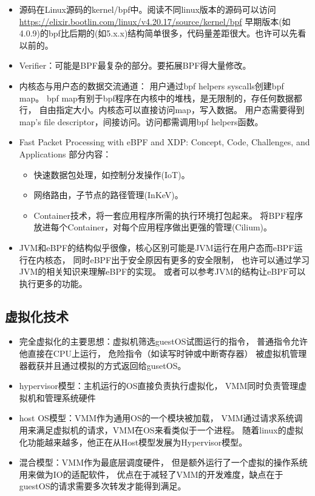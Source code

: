 \documentclass[AutoFakeBold,a4paper]{ctexart}
\begin{document}
\begin{itemize}
    \item 源码在Linux源码的kernel/bpf中。阅读不同linux版本的源码可以访问
    \url{https://elixir.bootlin.com/linux/v4.20.17/source/kernel/bpf}
    早期版本(如4.0.9)的bpf比后期的(如5.x.x)结构简单很多，代码量差距很大。也许可以先看以前的。
    \item Verifier：可能是BPF最复杂的部分。要拓展BPF得大量修改。
    \item 内核态与用户态的数据交流通道：
    用户通过bpf helpers syscalls创建bpf map。
    bpf map有别于bpf程序在内核中的堆栈，是无限制的，存任何数据都行，
    自由指定大小。内核态可以直接访问map，写入数据。
    用户态需要得到map's file descriptor，间接访问。访问都需调用bpf helpers函数。
    \item Fast Packet Processing with eBPF and XDP: 
    Concept, Code, Challenges, and Applications 部分内容：
    \begin{itemize}
        \item 快速数据包处理，如控制分发操作(IoT)。
        \item 网络路由，子节点的路径管理(InKeV)。
        \item Container技术，将一套应用程序所需的执行环境打包起来。
        将BPF程序放进每个Container，对每个应用程序做出更强的管理(Cilium)。
    \end{itemize}
    \item JVM和eBPF的结构似乎很像，核心区别可能是JVM运行在用户态而eBPF运行在内核态，
    同时eBPF出于安全原因有更多的安全限制，
    也许可以通过学习JVM的相关知识来理解eBPF的实现。
    或者可以参考JVM的结构让eBPF可以执行更多的功能。
\end{itemize}

\subsection{虚拟化技术}

\begin{itemize}
    \item 完全虚拟化的主要思想：虚拟机筛选guestOS试图运行的指令，
    普通指令允许他直接在CPU上运行，
    危险指令（如读写时钟或中断寄存器）
    被虚拟机管理器截获并且通过模拟的方式返回给gusetOS。
    \item hypervisor模型：主机运行的OS直接负责执行虚拟化，
    VMM同时负责管理虚拟机和管理系统硬件
    \item host OS模型：VMM作为通用OS的一个模块被加载，
    VMM通过请求系统调用来满足虚拟机的请求，VMM在OS来看类似于一个进程。
    随着linux的虚拟化功能越来越多，他正在从Host模型发展为Hypervisor模型。
    \item 混合模型：VMM作为最底层调度硬件，
    但是额外运行了一个虚拟的操作系统用来做为IO的适配软件，
    优点在于减轻了VMM的开发难度，缺点在于guestOS的请求需要多次转发才能得到满足。
\end{itemize}
\end{document}
